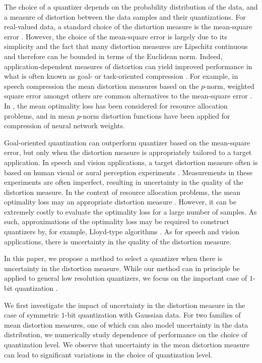 \documentclass[journal]{IEEEtran}
\begin{document}
The choice of a quantizer depends on the probability distribution of the data, and a measure of distortion between the data samples and their quantizations. For real-valued data, a standard choice of the distortion measure is the mean-square error \cite{Gersho2012vector}. However, the choice of the mean-square error is largely due to its simplicity and the fact that many distortion measures are Lipschitz continuous and therefore can be bounded in terms of the Euclidean norm. Indeed, application-dependent measures of distortion can yield improved performance in what is often known as goal- or task-oriented compression \cite{Gunduz2022beyond}. For example, in speech compression the mean distortion measures based on the $p$-norm, weighted square error amongst others are common alternatives to the mean-square error \cite{Linde1980algorithm}. In \cite{Zou2022goal}, the mean optimality loss has been considered for resource allocation problems, and in \cite{Nahshan2021loss} mean $p$-norm distortion functions have been applied for compression of neural network weights. 

Goal-oriented quantization can outperform quantizer based on the mean-square error, but only when the distortion measure is appropriately tailored to a target application. In speech and vision applications, a target distortion measure often is based on human visual or aural perception experiments \cite{Jayant1993signal,Eckert1998perceptual}. Measurements in these experiments are often imperfect, resulting in uncertainty in the quality of the distortion measure. In the context of resource allocation problems, the mean optimality loss may an appropriate distortion measure \cite{Zou2022goal}. However, it can be extremely costly to evaluate the optimality loss for a large number of samples. As such, approximations of the optimality loss may be required to construct quantizers by, for example, Lloyd-type algorithms \cite{Linde1980algorithm}. As for speech and vision applications, there is uncertainty in the quality of the distortion measure.

In this paper, we propose a method to select a quantizer when there is uncertainty in the distortion measure. While our method can in principle be applied to general low resolution quantizers, we focus on the important case of $1$-bit quantization \cite{Magnani2005optimal}.

We first investigate the impact of uncertainty in the distortion measure in the case of symmetric $1$-bit quantization with Gaussian data. For two families of mean distortion measures, one of which can also model uncertainty in the data distribution, we numerically study dependence of performance on the choice of quantization level. We observe that uncertainty in the mean distortion measure can lead to significant variations in the choice of quantization level. 
\end{document}
